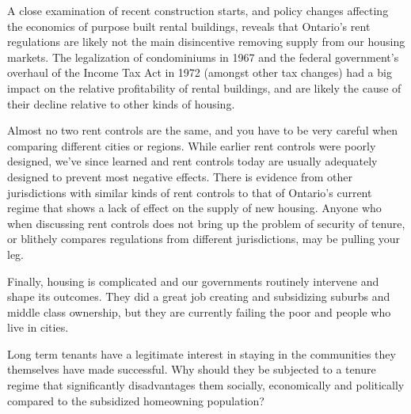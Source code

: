 A close examination of recent construction starts, and policy changes affecting the economics of purpose built rental buildings, reveals that Ontario's rent regulations are likely not the main disincentive removing supply from our housing markets. The legalization of condominiums in 1967 and the federal government's overhaul of the Income Tax Act in 1972 (amongst other tax changes) had a big impact on the relative profitability of rental buildings, and are likely the cause of their decline relative to other kinds of housing.

Almost no two rent controls are the same, and you have to be very careful when comparing different cities or regions. While earlier rent controls were poorly designed, we've since learned and rent controls today are usually adequately designed to prevent most negative effects. There is evidence from other jurisdictions with similar kinds of rent controls to that of Ontario's current regime that shows a lack of effect on the supply of new housing. Anyone who when discussing rent controls does not bring up the problem of security of tenure, or blithely compares regulations from different jurisdictions, may be pulling your leg.


Finally, housing is complicated and our governments routinely intervene and shape its outcomes. They did a great job creating and subsidizing suburbs and middle class ownership, but they are currently failing the poor and people who live in cities.

Long term tenants have a legitimate interest in staying in the communities they themselves have made successful. Why should they be subjected to a tenure regime that significantly disadvantages them socially, economically and politically compared to the subsidized homeowning population?


